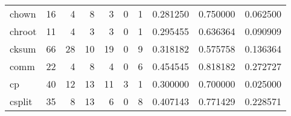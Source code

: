\begin{tabular}{lrrrrrrrrr}
chown     &                                      16 &                                                  4 &                                                  8 &                                                  3 &                                                  0 &                                                  1 &                                           0.281250 &                               0.750000 &                             0.062500 \\
chroot    &                                      11 &                                                  4 &                                                  3 &                                                  3 &                                                  0 &                                                  1 &                                           0.295455 &                               0.636364 &                             0.090909 \\
cksum     &                                      66 &                                                 28 &                                                 10 &                                                 19 &                                                  0 &                                                  9 &                                           0.318182 &                               0.575758 &                             0.136364 \\
comm      &                                      22 &                                                  4 &                                                  8 &                                                  4 &                                                  0 &                                                  6 &                                           0.454545 &                               0.818182 &                             0.272727 \\
cp        &                                      40 &                                                 12 &                                                 13 &                                                 11 &                                                  3 &                                                  1 &                                           0.300000 &                               0.700000 &                             0.025000 \\
csplit    &                                      35 &                                                  8 &                                                 13 &                                                  6 &                                                  0 &                                                  8 &                                           0.407143 &                               0.771429 &                             0.228571 \\

\end{tabular}
